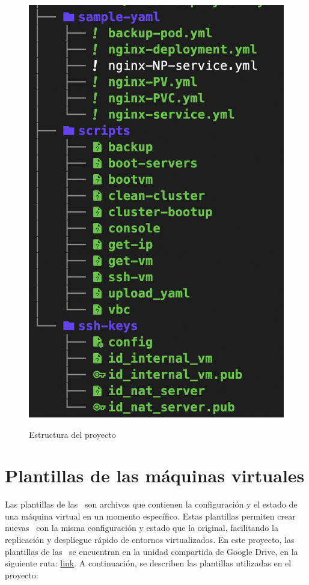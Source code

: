 \begin{figure}[H]
\begin{minipage}{0.48\textwidth}
        \includegraphics[scale=0.35]{tablas-images/cp6/src/tree-2.png}
        \label{fig:estructura-proyecto-2}
    \end{minipage}
    \caption{Estructura del proyecto}\label{fig:estructura-proyecto}
\end{figure}

\section{Plantillas de las máquinas virtuales}\label{sec:plantillas-vm}
\noindent
Las plantillas de las \VM\ son archivos que contienen la configuración y el estado de una máquina virtual en un momento específico. Estas plantillas permiten crear nuevas \VM\ con la misma configuración y estado que la original, facilitando la replicación y despliegue rápido de entornos virtualizados. En este proyecto, las plantillas de las \VM\ se encuentran en la unidad compartida de Google Drive, en la siguiente ruta: \href{https://drive.google.com/drive/folders/1Ar2ifFR9WufCqmZMt2NMJ2OzLG9Gucas?usp=sharing}{link}. A continuación, se describen las plantillas utilizadas en el proyecto:
